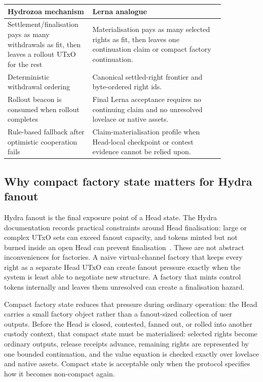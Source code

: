 \documentclass[a4paper,11pt]{article}
\theoremstyle{definition}
\theoremstyle{plain}
\theoremstyle{remark}
\begin{document}
\begin{center}
\begin{tabular}{L{0.30\linewidth}L{0.55\linewidth}}
\toprule
\textbf{Hydrozoa mechanism} & \textbf{Lerna analogue}\\
\midrule
Settlement/finalisation pays as many withdrawals as fit, then leaves a rollout
UTxO for the rest & Materialisation pays as many selected rights as fit, then
leaves one continuation claim or compact factory continuation.\\
Deterministic withdrawal ordering & Canonical settled-right frontier and
byte-ordered right ids.\\
Rollout beacon is consumed when rollout completes & Final Lerna acceptance
requires no continuing claim and no unresolved lovelace or native assets.\\
Rule-based fallback after optimistic cooperation fails & Claim-materialisation
profile when Head-local checkpoint or contest evidence cannot be relied upon.\\
\bottomrule
\end{tabular}
\end{center}

\subsection{Why compact factory state matters for Hydra fanout}
\label{sec:compact-fanout}

Hydra fanout is the final exposure point of a Head state. The Hydra
documentation records practical constraints around Head finalisation: large or
complex UTxO sets can exceed fanout capacity, and tokens minted but not burned
inside an open Head can prevent finalisation~\cite{hydra-known}. These are not
abstract inconveniences for factories. A naive virtual-channel factory that
keeps every right as a separate Head UTxO can create fanout pressure exactly
when the system is least able to negotiate new structure. A factory that mints
control tokens internally and leaves them unresolved can create a finalisation
hazard.

Compact factory state reduces that pressure during ordinary operation: the Head
carries a small factory object rather than a fanout-sized collection of user
outputs. Before the Head is closed, contested, fanned out, or rolled into
another custody context, that compact state must be materialised: selected
rights become ordinary outputs, release receipts advance, remaining rights are
represented by one bounded continuation, and the value equation is checked
exactly over lovelace and native assets. Compact state is acceptable only when
the protocol specifies how it becomes non-compact again.
\end{document}
